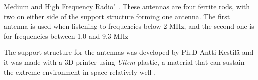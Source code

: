 \documentclass[english,12pt,a4paper,pdftex,elec,utf8]{aaltothesis}
\begin{document}
Medium and High Frequency Radio" \cite{petridippa}. These antennas are four ferrite rods, with two on either side of the support structure forming one antenna. The first antenna is used when listening to frequencies below 2 MHz, and the second one is for frequencies between 1.0 and 9.3 MHz.\par 
The support structure for the antennas was developed by Ph.D Antti Kestilä and it was made with a 3D printer using \textit{Ultem} plastic, a material that can sustain the extreme environment in space relatively well \cite{ultem}.\par 
\end{document}
